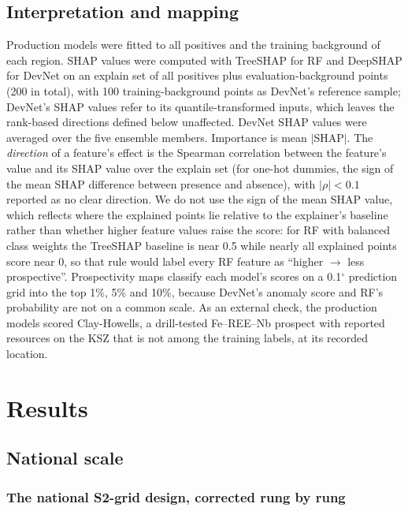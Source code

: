 \documentclass[pdflatex,sn-apa]{sn-jnl}
\begin{document}
\subsection{Interpretation and mapping}\label{sec:shap}

Production models were fitted to all positives and the training background of each region. SHAP values \citep{Lundberg2017} were computed with TreeSHAP for RF \citep{Lundberg2020} and DeepSHAP for DevNet on an explain set of all positives plus evaluation-background points (200 in total), with 100 training-background points as DevNet's reference sample; DevNet's SHAP values refer to its quantile-transformed inputs, which leaves the rank-based directions defined below unaffected. DevNet SHAP values were averaged over the five ensemble members. Importance is mean $|$SHAP$|$. The \emph{direction} of a feature's effect is the Spearman correlation between the feature's value and its SHAP value over the explain set (for one-hot dummies, the sign of the mean SHAP difference between presence and absence), with $|\rho| < 0.1$ reported as no clear direction. We do not use the sign of the mean SHAP value, which reflects where the explained points lie relative to the explainer's baseline rather than whether higher feature values raise the score: for RF with balanced class weights the TreeSHAP baseline is near 0.5 while nearly all explained points score near 0, so that rule would label every RF feature as ``higher $\rightarrow$ less prospective''. Prospectivity maps classify each model's scores on a 0.1$^\circ$ prediction grid into the top 1\%, 5\% and 10\%, because DevNet's anomaly score and RF's probability are not on a common scale. As an external check, the production models scored Clay-Howells, a drill-tested Fe--REE--Nb prospect with reported resources on the KSZ \citep{OGS2011} that is not among the training labels, at its recorded location.

\section{Results}\label{sec:results}

\subsection{National scale}\label{sec:res-national}

\subsubsection{The national S2-grid design, corrected rung by rung}\label{sec:res-ladder}
\end{document}
